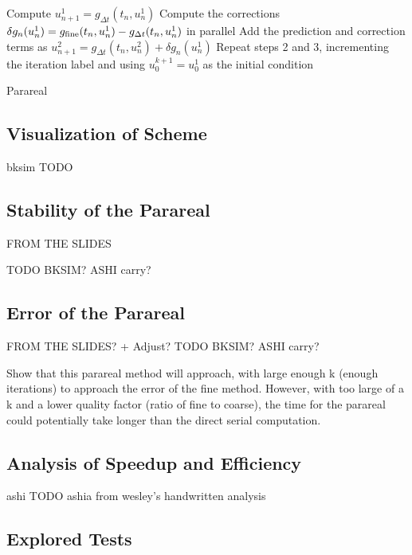 \documentclass[letterpaper,11pt]{article}
\begin{document}
\begin{algorithm}[t]
    Compute $u^1_{n+1} = g_{\Delta t}(t_n, u^1_n)$\;
    Compute the corrections $\delta g_n(u^1_n) = g_{\textnormal{fine}}(t_n,
    u^1_n) - g_{\Delta t}(t_n, u^1_n)$ in parallel\;
    Add the prediction and correction terms as $u^2_{n+1} = g_{\Delta t}(t_n,
    u^2_n) + \delta g_n(u^1_n)$\;
    Repeat steps 2 and 3, incrementing the iteration label and using $u^{k+1}_0
    = u^1_0$ as the initial condition\;
 \caption{Parareal}
 \label{alg:parareal}
\end{algorithm}

\subsection{Visualization of Scheme}

bksim TODO

\subsection{Stability of the Parareal}

FROM THE SLIDES 

TODO BKSIM? ASHI carry?

\subsection{Error of the Parareal}

FROM THE SLIDES? + Adjust?
TODO BKSIM? ASHI carry?

Show that this parareal method will approach, with large enough k (enough iterations) to approach the error of the fine method.  However, with too large of a k and a lower quality factor (ratio of fine to coarse), the time for the parareal could potentially take longer than the direct serial computation.

\subsection{Analysis of Speedup and Efficiency}

ashi TODO ashia from wesley's handwritten analysis

\subsection{Explored Tests}
\end{document}
